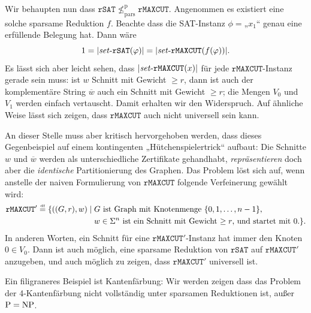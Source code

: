 Wir behaupten nun dass $\mathtt{rSAT} \not\leq_\mathrm{pars}^\mathrm p \mathtt{rMAXCUT}$. Angenommen es existiert eine solche sparsame Reduktion $f$. Beachte dass die SAT-Instanz $\phi={}$„$x_1$“ genau eine erfüllende Belegung hat. Dann wäre
\[ 1=|\mathit{set}\text{-}{}\mathtt{rSAT}(\varphi)|=|\mathit{set}\text{-}{}\mathtt{rMAXCUT}(f(\varphi))|. \]
Es lässt sich aber leicht sehen, dass $|\mathit{set}\text{-}{}\mathtt{rMAXCUT}(x)|$ für jede $\mathtt{rMAXCUT}$-Instanz gerade sein muss: ist $w$ Schnitt mit Gewicht $\geq r$, dann ist auch der komplementäre String $\overline{w}$ auch ein Schnitt mit Gewicht $\geq r$; die Mengen $V_0$ und $V_1$ werden einfach vertauscht.
Damit erhalten wir den Widerspruch. Auf ähnliche Weise lässt sich zeigen, dass $\mathtt{rMAXCUT}$ auch nicht universell sein kann.

An dieser Stelle muss aber kritisch hervorgehoben werden, dass dieses Gegenbeispiel auf einem kontingenten „Hütchenspielertrick“ aufbaut: Die Schnitte $w$ und $\overline{w}$ werden als unterschiedliche Zertifikate gehandhabt, \emph{repräsentieren} doch aber die \emph{identische} Partitionierung des Graphen.
Das Problem löst sich auf, wenn anstelle der naiven Formulierung von $\mathtt{rMAXCUT}$ folgende Verfeinerung gewählt wird:
\[ \begin{split} \mathtt{rMAXCUT'} \stackrel{\text{\smash{\tiny df}}}{=} \{ ((G, r), w) \mid {}&\text{$G$ ist Graph mit Knotenmenge $\{0,1,\dots,n-1\}$,} \\ &\text{$w\in\Sigma^n$ ist ein Schnitt mit Gewicht $\geq r$, und startet mit $0$.} \}.\end{split} \]
In anderen Worten, ein Schnitt für eine $\mathtt{rMAXCUT'}$-Instanz hat immer den Knoten $0\in V_0$.
Dann ist auch möglich, eine sparsame Reduktion von $\mathtt{rSAT}$ auf $\mathtt{rMAXCUT'}$ anzugeben, und auch möglich zu zeigen, dass $\mathtt{rMAXCUT'}$ universell ist.

Ein filigraneres Beispiel ist Kantenfärbung:  Wir werden zeigen dass das Problem der 4-Kantenfärbung nicht vollständig unter sparsamen Reduktionen ist, außer $\mathrm{P}=\mathrm{NP}$.


